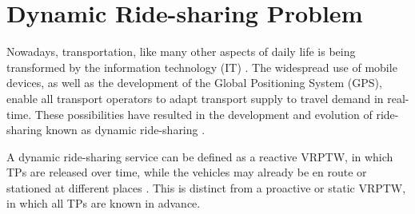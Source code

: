\section{Dynamic Ride-sharing Problem}
\label{sec:dynamic}
Nowadays, transportation, like many other aspects of daily life is being transformed by the information technology (IT) \cite{golob2001impacts}. The widespread use of mobile devices, as well as the development of the Global Positioning System (GPS), enable all transport operators to adapt transport supply to travel demand in real-time. These possibilities have resulted in the development and evolution of ride-sharing known as dynamic ride-sharing \cite{srinivasan2006impact, altshuler2017ridesharing}.

A dynamic ride-sharing service can be defined as a reactive VRPTW, in which TPs are released over time, while the vehicles may already be en route or stationed at different places \cite{kucharski2017realtime, liao2024towards}. This is distinct from a proactive or static VRPTW, in which all TPs are known in advance. 

